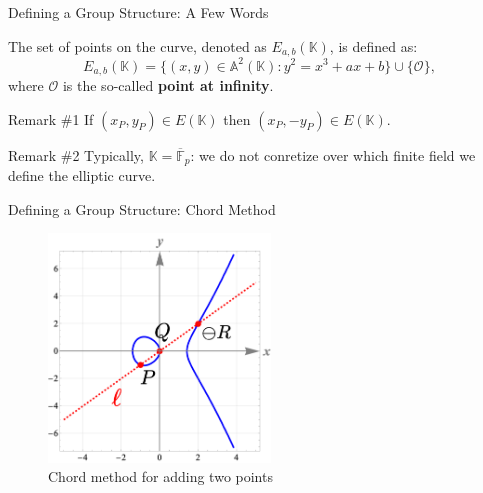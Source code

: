 \documentclass{beamer}
\begin{document}
    \begin{frame}{Defining a Group Structure: A Few Words}
        \begin{definition}
            The set of points on the curve, denoted as $E_{a,b}(\mathbb{K})$, is defined as:
            \begin{equation*}
                E_{a,b}(\mathbb{K}) = \{(x,y) \in \mathbb{A}^2(\mathbb{K}): y^2=x^3+ax+b\} \cup \{\mathcal{O}\},
            \end{equation*}
            where $\mathcal{O}$ is the so-called \textbf{point at infinity}.\pause
        \end{definition}

        \begin{block}{Remark \#1}
            If $(x_P,y_P) \in E(\mathbb{K})$ then $(x_P,-y_P) \in E(\mathbb{K})$.\pause
        \end{block}

        \begin{block}{Remark \#2}
            Typically, $\mathbb{K} = \overline{\mathbb{F}}_p$: we do not conretize over which finite field we define the elliptic curve.
        \end{block}
    \end{frame}

    \begin{frame}{Defining a Group Structure: Chord Method}
        \begin{figure}
            \centering
            \includegraphics[width=0.525\textwidth]{images/lecture_3/ec_illustration_4.png}
            \caption{Chord method for adding two points}
            \label{fig:ec_4}
        \end{figure}
    \end{frame}
\end{document}

